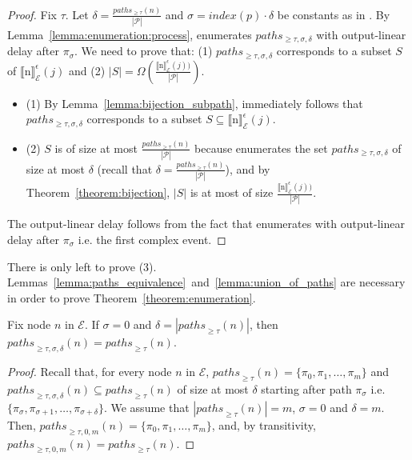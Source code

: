 \begin{proof}
  Fix $\tau$. Let $\delta = \frac{paths_{\ge \tau}(n)}{|\mathcal{P}|}$ and $\sigma = index(p) \cdot \delta$ be constants as in . By Lemma~\ref{lemma:enumeration:process},  enumerates $paths_{\ge \tau, \sigma, \delta}$ with output-linear delay after $\pi_{\sigma}$. We need to prove that: (1) $paths_{\ge \tau, \sigma, \delta}$ corresponds to a subset $S$ of ${\llbracket \text{n} \rrbracket}^{\epsilon}_{\mathcal{E}}(j)$ and (2) $|S| = \Omega(\frac{{\llbracket \text{n} \rrbracket}^{\epsilon}_{\mathcal{E}}(j))}{|\mathcal{P}|})$.

 \begin{itemize}
   \item (1) By Lemma~\ref{lemma:bijection_subpath}, immediately follows that $paths_{\ge \tau, \sigma, \delta}$ corresponds to a subset $S \subseteq {\llbracket \text{n} \rrbracket}^{\epsilon}_{\mathcal{E}}(j)$.
   \item (2) $S$ is of size at most $\frac{paths_{\ge \tau}(n)}{|\mathcal{P}|}$ because  enumerates the set $paths_{\ge \tau, \sigma, \delta}$ of size at most $\delta$ (recall that $\delta = \frac{paths_{\ge \tau}(n)}{|\mathcal{P}|}$), and by Theorem~\ref{theorem:bijection}, $|S|$ is at most of size $\frac{{\llbracket \text{n} \rrbracket}^{\epsilon}_{\mathcal{E}}(j))}{|\mathcal{P}|}$.
 \end{itemize}

 The output-linear delay follows from the fact that  enumerates with output-linear delay after $\pi_{\sigma}$ i.e. the first complex event.
\end{proof}

There is only left to prove (3). Lemmas~\ref{lemma:paths_equivalence}~and~\ref{lemma:union_of_paths} are necessary in order to prove Theorem~\ref{theorem:enumeration}.

\begin{lemma}\label{lemma:paths_equivalence}
  Fix node $n$ in $\mathcal{E}$. If $\sigma = 0$ and $\delta = |{paths}_{\ge \tau}(n)|$, then ${paths}_{\ge \tau, \sigma, \delta}(n) = {paths}_{\ge \tau}(n)$.
\end{lemma}

\begin{proof}
  Recall that, for every node $n$ in $\mathcal{E}$, ${paths}_{\ge \tau}(n) = \{ \pi_{0}, \pi_{1}, \ldots, \pi_{m} \}$ and ${paths}_{\ge \tau, \sigma, \delta}(n) \subseteq {paths}_{\ge \tau}(n)$ of size at most $\delta$ starting after path $\pi_{\sigma}$ i.e. $\{ \pi_{\sigma}, \pi_{\sigma+1}, \ldots, \pi_{\sigma+\delta}\}$. We assume that $|{paths}_{\ge \tau}(n)| = m$, $\sigma = 0$ and $\delta = m$. Then, ${paths}_{\ge \tau, 0, m}(n) = \{ \pi_{0}, \pi_{1}, \ldots, \pi_{m}\}$, and, by transitivity, ${paths}_{\ge \tau, 0, m}(n) = {paths}_{\ge \tau}(n)$.
\end{proof}












